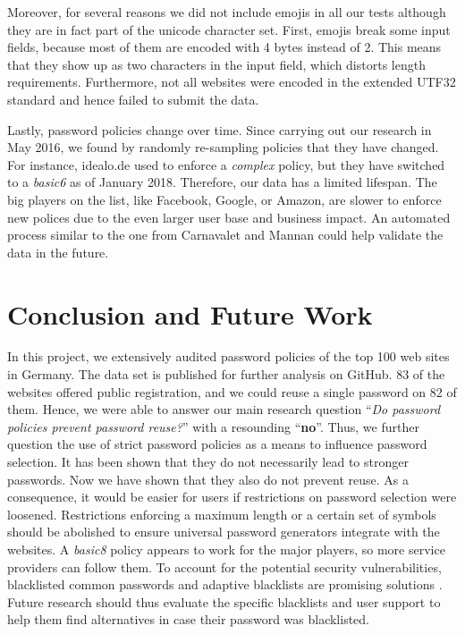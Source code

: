 Moreover, for several reasons we did not include emojis in all our tests although they are in fact part of the unicode character set. First, emojis break some input fields, because most of them are encoded with 4 bytes instead of 2. This means that they show up as two characters in the input field, which distorts length requirements. Furthermore, not all websites were encoded in the extended UTF32 standard and hence failed to submit the data. 

Lastly, password policies change over time. Since carrying out our research in May 2016, we found by randomly re-sampling policies that they have changed. For instance, idealo.de used to enforce a \textit{complex} policy, but they have switched to a \textit{basic6} as of January 2018. Therefore, our data has a limited lifespan. The big players on the list, like Facebook, Google, or Amazon, are slower to enforce new polices due to the even larger user base and business impact. An automated process similar to the one from Carnavalet and Mannan \cite{Carnavalet2014AnalyzingPWStrengthMeters} could help validate the data in the future. 

\section{Conclusion and Future Work}
In this project, we extensively audited password policies of the top 100 web sites in Germany. The data set is published for further analysis on GitHub. 83 of the websites offered public registration, and we could reuse a single password on 82 of them. Hence, we were able to answer our main research question ``\textit{Do password policies prevent password reuse?}'' with a resounding ``\textbf{no}''. Thus, we further question the use of strict password policies as a means to influence password selection. It has been shown that they do not necessarily lead to stronger passwords. Now we have shown that they also do not prevent reuse. As a consequence, it would be easier for users if restrictions on password selection were loosened. Restrictions enforcing a maximum length or a certain set of symbols should be abolished to ensure universal password generators integrate with the websites. A \textit{basic8} policy appears to work for the major players, so more service providers can follow them. To account for the potential security vulnerabilities, blacklisted common passwords and adaptive blacklists are promising solutions \cite{Habib2017Blacklists, Segreti2017AdaptivePolicies}.  Future research should thus evaluate the specific blacklists and user support to help them find alternatives in case their password was blacklisted. 

